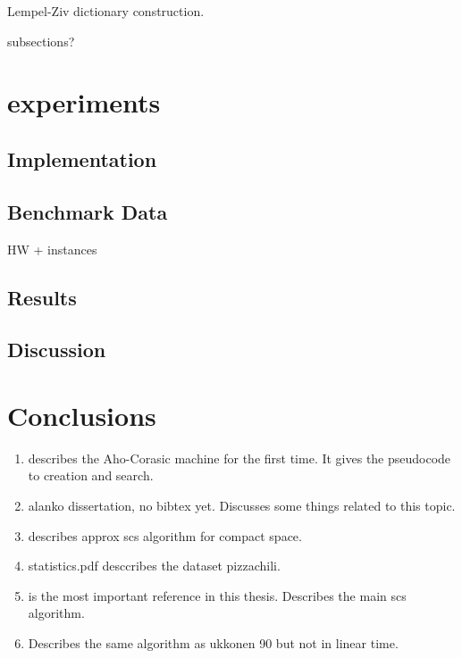 \documentclass[english,twoside,censored,csm,algorithms-track-2020]{HYthesisML}
\theoremstyle{plain}
\theoremstyle{definition}
\begin{document}
  Lempel-Ziv dictionary construction.

  subsections?

\chapter{experiments}

  \section{Implementation}

  \section{Benchmark Data}
  HW + instances

  \section{Results}

  \section{Discussion}

%
\chapter{Conclusions}
  

  \begin{enumerate}
  \item \citep{aho75} describes the Aho-Corasic machine for the first time. It gives the pseudocode to creation and search.
  \item alanko dissertation, no bibtex yet. Discusses some things related to this topic.
  \item \citep{alanko17} describes approx scs algorithm for compact space.
  \item statistics.pdf desccribes the dataset pizzachili.
  \item \citep{ukkonen90} is the most important reference in this thesis. Describes the main scs algorithm.
  \item \citep{tarhio88} Describes the same algorithm as ukkonen 90 but not in linear time.
  \end{enumerate}
\end{document}
